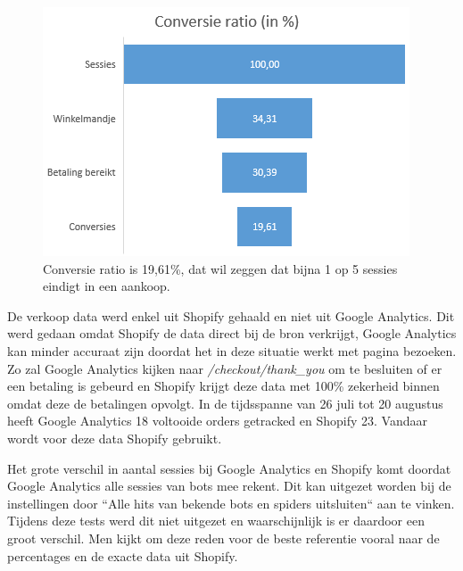 \begin{figure}
	\includegraphics[]{img/conversie-ratio-trechter.png}
	\centering
	\caption{Conversie ratio is 19,61\%, dat wil zeggen dat bijna 1 op 5 sessies eindigt in een aankoop.}
	\label{fig:conversie-ratio-trechter}
\end{figure}

De verkoop data werd enkel uit Shopify gehaald en niet uit Google Analytics. Dit werd gedaan omdat Shopify de data direct bij de bron verkrijgt, Google Analytics kan minder accuraat zijn doordat het in deze situatie werkt met pagina bezoeken. Zo zal Google Analytics kijken naar \emph{/checkout/thank\_you} om te besluiten of er een betaling is gebeurd en Shopify krijgt deze data met 100\% zekerheid binnen omdat deze de betalingen opvolgt. In de tijdsspanne van 26 juli tot 20 augustus heeft Google Analytics 18 voltooide orders getracked en Shopify 23. Vandaar wordt voor deze data Shopify gebruikt.

Het grote verschil in aantal sessies bij Google Analytics en Shopify komt doordat Google Analytics alle sessies van bots mee rekent. Dit kan uitgezet worden bij de instellingen door ``Alle hits van bekende bots en spiders uitsluiten`` aan te vinken. Tijdens deze tests werd dit niet uitgezet en waarschijnlijk is er daardoor een groot verschil. Men kijkt om deze reden voor de beste referentie vooral naar de percentages en de exacte data uit Shopify.

